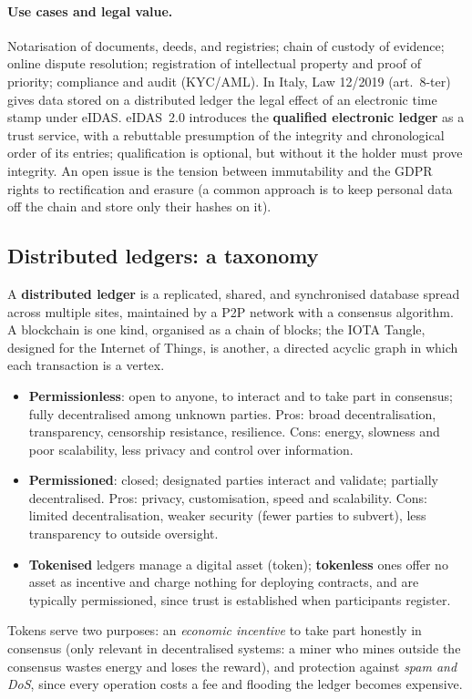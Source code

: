 \paragraph{Use cases and legal value.} Notarisation of documents, deeds, and registries; chain of custody of evidence; online dispute resolution; registration of intellectual property and proof of priority; compliance and audit (KYC/AML). In Italy, Law 12/2019 (art.~8-ter) gives data stored on a distributed ledger the legal effect of an electronic time stamp under eIDAS. eIDAS~2.0 introduces the \textbf{qualified electronic ledger} as a trust service, with a rebuttable presumption of the integrity and chronological order of its entries; qualification is optional, but without it the holder must prove integrity. An open issue is the tension between immutability and the GDPR rights to rectification and erasure (a common approach is to keep personal data off the chain and store only their hashes on it).

\subsection{Distributed ledgers: a taxonomy}

A \textbf{distributed ledger} is a replicated, shared, and synchronised database spread across multiple sites, maintained by a P2P network with a consensus algorithm. A blockchain is one kind, organised as a chain of blocks; the IOTA Tangle, designed for the Internet of Things, is another, a directed acyclic graph in which each transaction is a vertex.

\begin{itemize}
    \item \textbf{Permissionless}: open to anyone, to interact and to take part in consensus; fully decentralised among unknown parties. Pros: broad decentralisation, transparency, censorship resistance, resilience. Cons: energy, slowness and poor scalability, less privacy and control over information.
    \item \textbf{Permissioned}: closed; designated parties interact and validate; partially decentralised. Pros: privacy, customisation, speed and scalability. Cons: limited decentralisation, weaker security (fewer parties to subvert), less transparency to outside oversight.
    \item \textbf{Tokenised} ledgers manage a digital asset (token); \textbf{tokenless} ones offer no asset as incentive and charge nothing for deploying contracts, and are typically permissioned, since trust is established when participants register.
\end{itemize}
Tokens serve two purposes: an \emph{economic incentive} to take part honestly in consensus (only relevant in decentralised systems: a miner who mines outside the consensus wastes energy and loses the reward), and protection against \emph{spam and DoS}, since every operation costs a fee and flooding the ledger becomes expensive.

